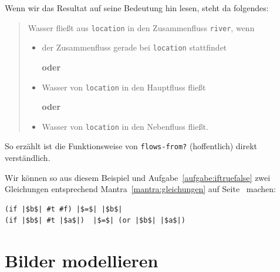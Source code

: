 %
Wenn wir das Resultat auf seine Bedeutung hin lesen, steht da folgendes:
%
\begin{quote}
  Wasser fließt aus \lstinline{location} in den Zusammenfluss \lstinline{river}, wenn

  \begin{itemize}
  \item der Zusammenfluss gerade bei \lstinline{location} stattfindet

    \centerline{\textbf{oder}}
  \item Wasser von \lstinline{location} in den Hauptfluss fließt

    \centerline{\textbf{oder}}
  \item Wasser von \lstinline{location} in den Nebenfluss fließt.
  \end{itemize}
\end{quote}
%
So erzählt ist die Funktionsweise von \lstinline{flows-from?}
(hoffentlich) direkt verständlich.

Wir können so aus diesem Beispiel und
Aufgabe~\ref{aufgabe:iftruefalse} zwei Gleichungen entsprechend
Mantra~\ref{mantra:gleichungen} auf Seite~\pageref{mantra:gleichungen}
machen:
%
\begin{lstlisting}
(if |$b$| #t #f) |$=$| |$b$|
(if |$b$| #t |$a$|)  |$=$| (or |$b$| |$a$|)
\end{lstlisting}
%

\section{Bilder modellieren}
\label{sec:image-combinators}

